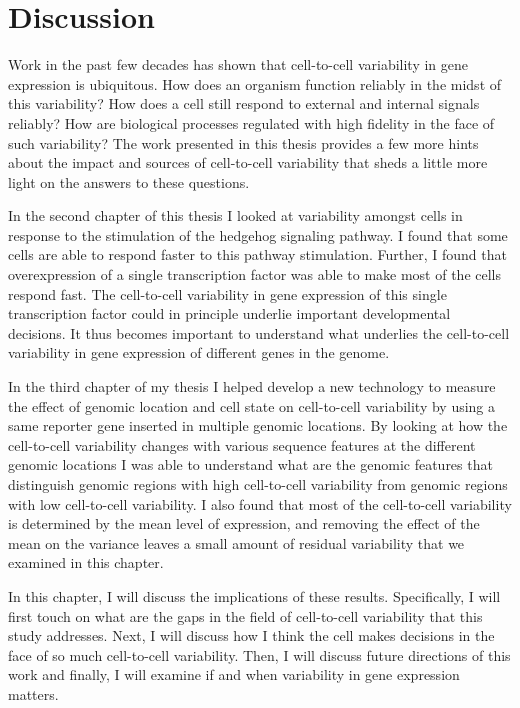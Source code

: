 \chapter{Discussion}
\label{chap:conclusion}
\tightlists

Work in the past few decades has shown that cell-to-cell variability in gene expression is ubiquitous. How does an organism function reliably in the midst of this variability? How does a cell still respond to external and internal signals reliably? How are biological processes regulated with high fidelity in the face of such variability? The work presented in this thesis provides a few more hints about the impact and sources of cell-to-cell variability that sheds a little more light on the answers to these questions.

In the second chapter of this thesis I looked at variability amongst cells in response to the stimulation of the hedgehog signaling pathway. I found that some cells are able to respond faster to this pathway stimulation. Further, I found that overexpression of a single transcription factor was able to make most of the cells respond fast. The cell-to-cell variability in gene expression of this single transcription factor could in principle underlie important developmental decisions. It thus becomes important to understand what underlies the cell-to-cell variability in gene expression of different genes in the genome.

In the third chapter of my thesis I helped develop a new technology to measure the effect of genomic location and cell state on cell-to-cell variability by using a same reporter gene inserted in multiple genomic locations. By looking at how the cell-to-cell variability changes with various sequence features at the different genomic locations I was able to understand what are the genomic features that distinguish genomic regions with high cell-to-cell variability from genomic regions with low cell-to-cell variability. I also found that most of the cell-to-cell variability is determined by the mean level of expression, and removing the effect of the mean on the variance leaves a small amount of residual variability that we examined in this chapter.

In this chapter, I will discuss the implications of these results. Specifically, I will first touch on what are the gaps in the field of cell-to-cell variability that this study addresses. Next, I will discuss how I think the cell makes decisions in the face of so much cell-to-cell variability. Then, I will discuss future directions of this work and finally, I will examine if and when variability in gene expression matters.

